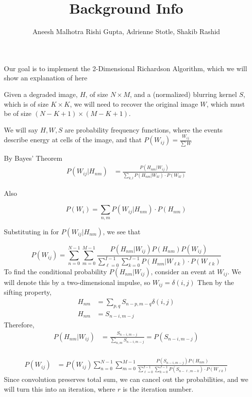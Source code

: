 \documentclass[11pt]{article}
\title{Background Info}
\author{Aneesh Malhotra Rishi Gupta, Adrienne Stotle,  Shakib Rashid}
\begin{document}
\maketitle
Our goal is to implement the 2-Dimensional Richardson Algorithm, which we will show an explanation of here

Given a degraded image, $H$, of size $N \times M$, and a (normalized) blurring kernel $S$, which is of size $K \times K$, we will need to recover the original image $W$, which must be of size $(N-K+1) \times (M - K +1)$. 

We will say $H,W,S$ are probability frequency functions, where the events describe energy at cells of the image, and that $P(W_{ij}) = \frac{W_{ij}}{\sum W}$

By Bayes' Theorem
\begin{align*}
P(W_{ij} | H_{nm}) &= \frac{P(H_{nm}|W_{ij})}{\sum \limits_{k,l}P(H_{nm} |W_{kl}) \cdot P(W_{kl})}
\end{align*}

Also

$$
P(W_i) = \sum \limits_{n,m} P(W_{ij}|H_{nm})\cdot P(H_{nm})
$$

Substituting in for $P(W_{ij} | H_{nm})$, we see that 

$$
P(W_{ij}) = \sum \limits_{n=0}^{N-1} \sum \limits_{m=0}^{M-1} \frac{P(H_{nm} | W_{ij}) P(H_{nm}) P(W_{ij})}{ \sum \limits_{\ell = 0}^{I-1} \sum \limits_{k=0}^{J-1} P(H_{nm}|W_{\ell k}) \cdot P(W_{\ell k})}
$$
To find the conditional probability $P(H_{nm}|W_{ij})$, consider an event at $W_{ij}$. We will denote this by a two-dimensional impulse, so $W_{ij} = \delta(i,j)$ Then by the sifting property,
\begin{align*}
H_{nm} &= \sum \limits_{p,q} S_{n-p,m-q} \delta(i,j) \\
H_{nm} &= S_{n-i,m-j}
\end{align*}
Therefore, 
\begin{align*}
P(H_{nm}|W_{ij}) &= \frac{S_{n-i,m-j}}{\sum \limits_{n,m} S_{n-i,m-j}} = P(S_{n-i,m-j})  \\
\end{align*}

\begin{align*}
P(W_{ij}) &= P(W_{ij}) \sum \limits_{n=0}^{N-1} \sum \limits_{m=0}^{M-1} \frac{P(S_{n-i,m-j}) P(H_{nm}) }{ \sum \limits_{\ell = 0}^{I-1} \sum \limits_{k=0}^{J-1} P(S_{n-\ell,m-k}) \cdot P(W_{\ell k})}
\end{align*}
Since convolution preserves total sum, we can cancel out the probabilities, and we will turn this into an iteration, where $r$ is the iteration number.
\end{document}
